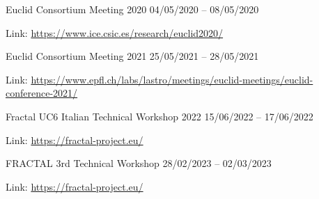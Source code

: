 \begin{cventries}
\cventry
{} %
{Euclid Consortium Meeting 2020} %
{} %
{04/05/2020 -- 08/05/2020} %
{ %
\begin{cvitems}
\item {}
\item {Link: \url{https://www.ice.csic.es/research/euclid2020/}}
\end{cvitems}
}


\cventry
{} %
{Euclid Consortium Meeting 2021} %
{} %
{25/05/2021 -- 28/05/2021} %
{ %
\begin{cvitems}
\item {}
\item {Link: \url{https://www.epfl.ch/labs/lastro/meetings/euclid-meetings/euclid-conference-2021/}}
\end{cvitems}
}


\cventry
{} %
{Fractal UC6 Italian Technical Workshop 2022} %
{} %
{15/06/2022 -- 17/06/2022} %
{ %
\begin{cvitems}
\item {}
\item {Link: \url{https://fractal-project.eu/}}
\end{cvitems}
}


\cventry
{} %
{FRACTAL 3rd Technical Workshop} %
{} %
{28/02/2023 -- 02/03/2023} %
{ %
\begin{cvitems}
\item {}
\item {Link: \url{https://fractal-project.eu/}}
\end{cvitems}
}


\end{cventries}